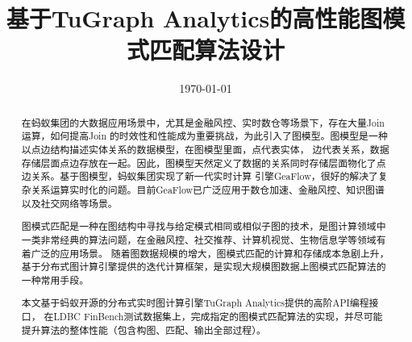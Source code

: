 

\pagestyle{fancy}
\fancyhf{} %


\fancyfoot[C]{\thepage}
\renewcommand{\headrulewidth}{0.4pt}
\renewcommand{\footrulewidth}{0.4pt}

\title{基于TuGraph Analytics的⾼性能图模式匹配算法设计}
\date{\today}





\maketitle

\begin{abstract}
在蚂蚁集团的大数据应用场景中，尤其是金融风控、实时数仓等场景下，存在大量Join运算，如何提高Join
的时效性和性能成为重要挑战，为此引入了图模型。图模型是一种以点边结构描述实体关系的数据模型，在图模型里面，点代表实体，
边代表关系，数据存储层面点边存放在一起。因此，图模型天然定义了数据的关系同时存储层面物化了点边关系。基于图模型，蚂蚁集团实现了新一代实时计算 引擎GeaFlow，很好的解决了复杂关系运算实时化的问题。目前GeaFlow已广泛应用于数仓加速、金融风控、知识图谱以及社交网络等场景。

图模式匹配是一种在图结构中寻找与给定模式相同或相似子图的技术，是图计算领域中一类非常经典的算法问题，在金融风控、社交推荐、计算机视觉、生物信息学等领域有着广泛的应用场景。
随着图数据规模的增大，图模式匹配的计算和存储成本急剧上升，基于分布式图计算引擎提供的迭代计算框架，是实现大规模图数据上图模式匹配算法的一种常用手段。

本文基于蚂蚁开源的分布式实时图计算引擎TuGraph Analytics提供的⾼阶API编程接口，
在LDBC FinBench测试数据集上，完成指定的图模式匹配算法的实现，并尽可能提升算法的整体性能（包含构图、匹配、输出全部过程）。
\end{abstract}

\newpage

\tableofcontents












